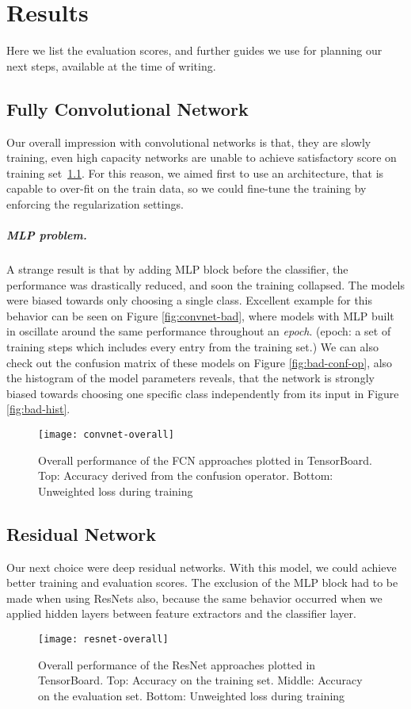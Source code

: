 \chapter{Results}
Here we list the evaluation scores, and further guides we use for planning our next steps, available at the time of writing.

\section{Fully Convolutional Network}
Our overall impression with convolutional networks is that, they are slowly training, even high capacity networks are unable to achieve satisfactory score on training set~\ref{fig:convnet-overall}. For this reason, we aimed first to use an architecture, that is capable to over-fit on the train data, so we could fine-tune the training by enforcing the regularization settings.
\paragraph{MLP problem.}
A strange result is that by adding MLP block before the classifier, the performance was drastically reduced, and soon the training collapsed.
The models were biased towards only choosing a single class.
Excellent example for this behavior can be seen on Figure \ref{fig:convnet-bad}, where models with MLP built in oscillate around the same performance throughout an \textit{epoch}. (epoch: a set of training steps which includes every entry from the training set.)
We can also check out the confusion matrix of these models
on Figure \ref{fig:bad-conf-op}, also the histogram of the model parameters reveals, that the network is strongly biased towards choosing one specific class independently from its input in Figure \ref{fig:bad-hist}.

\begin{figure}[h]
  \centering
  \texttt{[image: convnet-overall]}\label{fig:convnet-overall}
  \caption{Overall performance of the FCN approaches plotted in TensorBoard. Top: Accuracy derived from the confusion operator. Bottom: Unweighted loss during training}
\end{figure}

\section{Residual Network}
Our next choice were deep residual networks.
With this model, we could achieve better training and evaluation scores.
The exclusion of the MLP block had to be made when using ResNets also, because the same behavior occurred when we applied hidden layers between feature extractors and the classifier layer.

\begin{figure}[h]
  \centering
  \texttt{[image: resnet-overall]}\label{fig:resnet-overall}
  \caption{Overall performance of the ResNet approaches plotted in TensorBoard. Top: Accuracy on the training set. Middle: Accuracy on the evaluation set. Bottom: Unweighted loss during training}
\end{figure}
